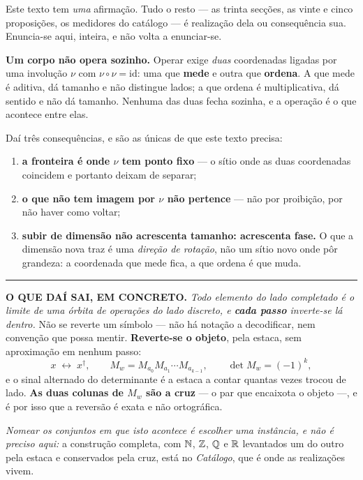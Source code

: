 \documentclass[livro.tex]{subfiles}
\begin{document}
Este texto tem \emph{uma} afirmação. Tudo o resto --- as trinta secções, as vinte e cinco
proposições, os medidores do catálogo --- é realização dela ou consequência sua. Enuncia-se aqui,
inteira, e não volta a enunciar-se.

\begin{mdframed}[linewidth=0.4pt,innerleftmargin=10pt,innerrightmargin=10pt,
                 innertopmargin=8pt,innerbottommargin=8pt,skipabove=6pt,skipbelow=6pt]
\textbf{Um corpo não opera sozinho.} Operar exige \emph{duas} coordenadas ligadas por uma involução
$\nu$ com $\nu\circ\nu=\mathrm{id}$: uma que \textbf{mede} e outra que \textbf{ordena}. A que mede é
aditiva, dá tamanho e não distingue lados; a que ordena é multiplicativa, dá sentido e não dá
tamanho. Nenhuma das duas fecha sozinha, e a operação é o que acontece entre elas.

\medskip
Daí três consequências, e são as únicas de que este texto precisa:
\begin{enumerate}\itemsep2pt
\item \textbf{a fronteira é onde $\nu$ tem ponto fixo} --- o sítio onde as duas coordenadas
coincidem e portanto deixam de separar;
\item \textbf{o que não tem imagem por $\nu$ não pertence} --- não por proibição, por não haver
como voltar;
\item \textbf{subir de dimensão não acrescenta tamanho: acrescenta fase.} O que a dimensão nova
traz é uma \emph{direção de rotação}, não um sítio novo onde pôr grandeza: a coordenada que mede
fica, a que ordena é que muda.
\end{enumerate}
\medskip

\hrule
\medskip
\noindent \textbf{O QUE DAÍ SAI, EM CONCRETO.} \emph{Todo elemento do lado completado é o limite
de uma órbita de operações do lado discreto, e \textbf{cada passo} inverte-se lá dentro.} Não se
reverte um símbolo --- não há notação a decodificar, nem convenção que possa mentir.
\textbf{Reverte-se o objeto}, pela estaca, sem aproximação em nenhum passo:
\[
  x \;\longleftrightarrow\; x^{\dagger},
  \qquad
  M_w = M_{a_0}M_{a_1}\cdots M_{a_{k-1}}, \qquad \det M_w = (-1)^k ,
\]
e o sinal alternado do determinante é a estaca a contar quantas vezes trocou de lado.
\textbf{As duas colunas de $M_w$ são a cruz} --- o par que encaixota o objeto ---, e é por isso
que a reversão é exata e não ortográfica.

\medskip
\noindent \emph{Nomear os conjuntos em que isto acontece é escolher uma instância, e não é
preciso aqui:} a construção completa, com $\mathbb{N}$, $\mathbb Z$, $\mathbb Q$ e $\mathbb R$ levantados um do outro pela
estaca e conservados pela cruz, está no \emph{Catálogo}, que é onde as realizações vivem.


\end{mdframed}
\end{document}
